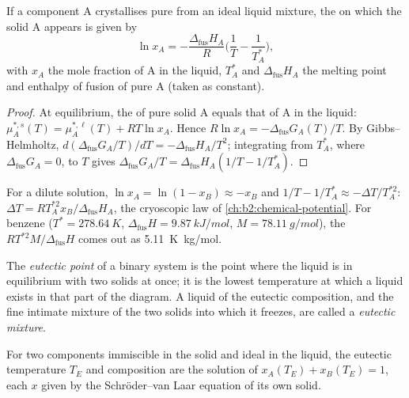 \begin{theorem}\label{thm:b2:solid-liquid-diagrams:schroder}
If a component A crystallises pure from an ideal liquid mixture, the 
on which the solid A appears is given by
\[
  \ln x_A = -\frac{\Delta_{\text{fus}}H_A}{R}\Big(\frac1T - \frac1{T_A^*}\Big),
\]
with $x_A$ the mole fraction of A in the liquid, $T_A^*$ and
$\Delta_{\text{fus}}H_A$ the melting point and enthalpy of fusion of pure A
(taken as constant).
\end{theorem}

\begin{proof}
At equilibrium, the  of pure solid A equals that of A in the
liquid: $\mu_A^{*,s}(T) = \mu_A^{*,\ell}(T) + RT\ln x_A$. Hence $R\ln x_A =
-\Delta_{\text{fus}}G_A(T)/T$. By Gibbs--Helmholtz, $d(\Delta_{\text{fus}}G_A/T)/
dT = -\Delta_{\text{fus}}H_A/T^2$; integrating from $T_A^*$, where
$\Delta_{\text{fus}}G_A = 0$, to $T$ gives $\Delta_{\text{fus}}G_A/T =
\Delta_{\text{fus}}H_A(1/T - 1/T_A^*)$.
\end{proof}

For a dilute solution, $\ln x_A = \ln(1 - x_B) \approx -x_B$ and $1/T -
1/T_A^* \approx -\Delta T/T_A^{*2}$: $\Delta T = RT_A^{*2}x_B/\Delta_{\text{fus}}H_A$,
the cryoscopic law of \cref{ch:b2:chemical-potential}. For benzene ($T^* =
\qty{278.64}{K}$, $\Delta_{\text{fus}}H = \qty{9.87}{kJ/mol}$, $M =
\qty{78.11}{g/mol}$), the  $RT^{*2}M/\Delta_{\text{fus}}H$
comes out as \qty{5.11}{K.kg/mol}.

\begin{definition}[Eutectic]\label{def:b2:solid-liquid-diagrams:eutectic}
The \emph{eutectic point} of a binary system is the
point where the liquid is in equilibrium with two solids at once; it is the
lowest temperature at which a liquid exists in that part of the diagram. A
liquid of the eutectic composition, and the fine intimate mixture of the two
solids into which it freezes, are called a \emph{eutectic
mixture}.
\end{definition}

\begin{corollary}\label{cor:b2:solid-liquid-diagrams:eutectic}
For two components immiscible in the solid and ideal in the liquid, the
eutectic temperature $T_E$ and composition are the solution of
$x_A(T_E) + x_B(T_E) = 1$, each $x$ given by the Schr\"oder--van Laar equation
of its own solid.
\end{corollary}

